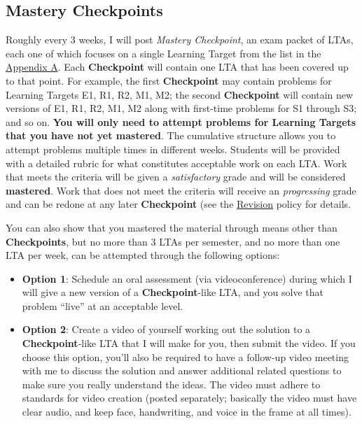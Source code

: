 \hypertarget{mastery-checkpoints}{%
\subsection{Mastery Checkpoints}\label{mastery-checkpoints}}

Roughly every 3 weeks, I will post \emph{Mastery Checkpoint}, an exam
packet of LTAs, each one of which focuses on a single Learning Target
from the list in the \protect\hyperlink{appendix-a}{Appendix A}. Each
\textbf{Checkpoint} will contain one LTA that has been covered up to
that point. For example, the first \textbf{Checkpoint} may contain
problems for Learning Targets E1, R1, R2, M1, M2; the second
\textbf{Checkpoint} will contain new versions of E1, R1, R2, M1, M2
along with first-time problems for S1 through S3; and so on. \textbf{You
will only need to attempt problems for Learning Targets that you have
not yet mastered}. The cumulative structure allows you to attempt
problems multiple times in different weeks. Students will be provided
with a detailed rubric for what constitutes acceptable work on each LTA.
Work that meets the criteria will be given a \emph{satisfactory} grade
and will be considered \textbf{mastered}. Work that does not meet the
criteria will receive an \emph{progressing} grade and can be redone at
any later \textbf{Checkpoint} (see the \href{revisions}{Revision} policy
for details.

You can also show that you mastered the material through means other
than \textbf{Checkpoints}, but no more than 3 LTAs per semester, and no
more than one LTA per week, can be attempted through the following
options:

\begin{itemize}
\tightlist
\item
  \textbf{Option 1}: Schedule an oral assessment (via videoconference)
  during which I will give a new version of a \textbf{Checkpoint}-like
  LTA, and you solve that problem ``live'' at an acceptable level.
\item
  \textbf{Option 2}: Create a video of yourself working out the solution
  to a \textbf{Checkpoint}-like LTA that I will make for you, then
  submit the video. If you choose this option, you'll also be required
  to have a follow-up video meeting with me to discuss the solution and
  answer additional related questions to make sure you really understand
  the ideas. The video must adhere to standards for video creation
  (posted separately; basically the video must have clear audio, and
  keep face, handwriting, and voice in the frame at all times).
\end{itemize}

